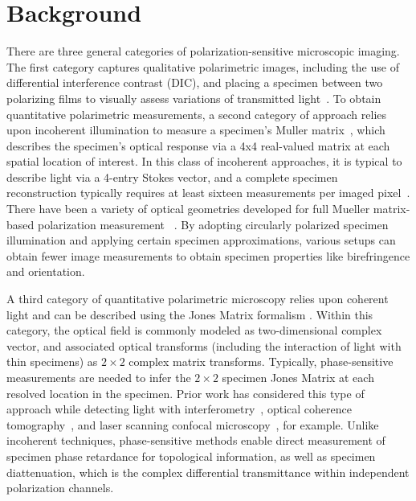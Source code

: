 \documentclass{article}
\begin{document}
\section{Background}
There are three general categories of polarization-sensitive microscopic imaging. The first category captures qualitative polarimetric images, including the use of differential interference contrast (DIC), and placing a specimen between two polarizing films to visually assess variations of transmitted light~\cite{bass2009handbook}. To obtain quantitative polarimetric measurements, a second category of approach relies upon incoherent illumination to measure a specimen’s Muller matrix~\cite{pezzaniti1995mueller}, which describes the specimen’s optical response via a 4x4 real-valued matrix at each spatial location of interest. In this class of incoherent approaches, it is typical to describe light via a 4-entry Stokes vector, and a complete specimen reconstruction typically requires at least sixteen measurements per imaged pixel~\cite{goldstein2017polarized}. There have been a variety of optical geometries developed for full Mueller matrix-based polarization measurement ~\cite{hielscher1997diffuse,yao1999two,chipman2018polarized,goldstein2017polarized,he2021polarisation}. By adopting circularly polarized specimen illumination and applying certain specimen approximations, various setups can obtain fewer image measurements to obtain specimen properties like birefringence and orientation\cite{he2021polarisation}.

A third category of quantitative polarimetric microscopy relies upon coherent light and can be described using the Jones Matrix formalism \cite{jones1941new}. Within this category, the optical field is commonly modeled as two-dimensional complex vector, and associated optical transforms (including the interaction of light with thin specimens) as $2\times2$ complex matrix transforms. Typically, phase-sensitive measurements are needed to infer the $2\times2$ specimen Jones Matrix at each resolved location in the specimen. Prior work has considered this type of approach while detecting light with interferometry~\cite{wang2008jones,aknoun2018quantitative,jiao2020real,saba2021polarization,colomb2002polarization,kim2012polarization,yang2016single,ge2021single}, optical coherence tomography~\cite{de2017polarization,yao1999two}, and laser scanning confocal microscopy~\cite{massoumian2003quantitative}, for example. Unlike incoherent techniques, phase-sensitive methods enable direct measurement of specimen phase retardance for topological information, as well as specimen diattenuation, which is the complex differential transmittance within independent polarization channels.
\end{document}
